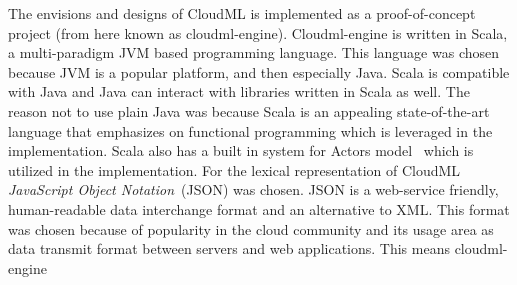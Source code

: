 


The envisions and designs of CloudML is implemented as a proof-of-concept project
(from here known as cloudml-engine).
Cloudml-engine is written in Scala, a multi-paradigm JVM based programming language.
This language was chosen because JVM is a popular platform, and then especially Java.
Scala is compatible with Java and Java can interact with libraries written in Scala as well.
The reason not to use plain Java was because Scala is an appealing state-of-the-art language that emphasizes 
on functional programming which is leveraged in the implementation.
Scala also has a built in system for Actors model~\cite{actors:haller07} which is utilized in the implementation.
For the lexical representation of CloudML \emph{JavaScript Object Notation}~(JSON) was chosen.
JSON is a web-service friendly, human-readable data interchange format and an alternative to XML.
This format was chosen because of popularity in the cloud community 
and its usage area as data transmit format between servers and web applications.
This means cloudml-engine
